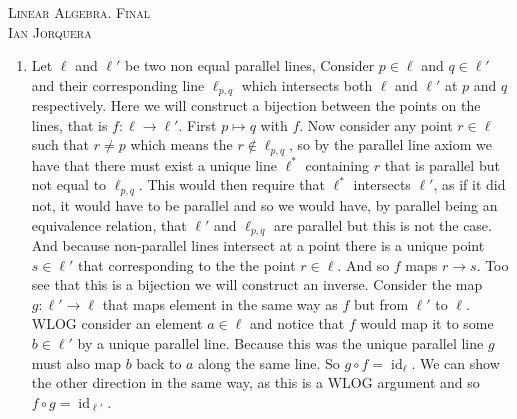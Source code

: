\documentclass[12pt]{amsart}
\theoremstyle{definition}
\DeclareMathOperator{\id}{\mathrm{id}}
\newcommand{\ra}{\rightarrow}
\begin{document}
\begin{center}
    \textsc{Linear Algebra. Final\\ Ian Jorquera}
\end{center}
\vspace{1em}

\begin{enumerate}

\item %
Let $\ell$ and $\ell'$ be two non equal parallel lines, Consider $p\in\ell$ and $q\in \ell'$ and their corresponding line $\ell_{p,q}$ which intersects both $\ell$ and $\ell'$ at $p$ and $q$ respectively. Here we will construct a bijection between the points on the lines, that is $f:\ell\ra \ell'$. First $p\mapsto q$ with $f$. Now consider any point $r\in \ell$ such that $r\neq p$ which means the $r\not\in \ell_{p,q}$, so by the parallel line axiom we have that there must exist a unique line $\ell^*$ containing $r$ that is parallel but not equal to $\ell_{p,q}$. This would then require that $\ell^*$ intersects $\ell'$, as if it did not, it would have to be parallel and so we would have, by parallel being an equivalence relation, that $\ell'$ and $\ell_{p,q}$ are parallel but this is not the case. And because non-parallel lines intersect at a point there is a unique point $s\in \ell'$ that corresponding to the the point $r\in \ell$. And so $f$ maps $r\ra s$. Too see that this is a bijection we will construct an inverse. Consider the map $g:\ell'\ra \ell$ that maps element in the same way as $f$ but from $\ell'$ to $\ell$. WLOG consider an element $a\in \ell$ and notice that $f$ would map it to some $b\in \ell'$ by a unique parallel line. Because this was the unique parallel line $g$ must also map $b$ back to $a$ along the same line. So $g\circ f =\id_{\ell}$. We can show the other direction in the same way, as this is a WLOG argument and so $f\circ g =\id_{\ell'}$.\\ %



\end{enumerate}
\end{document}
